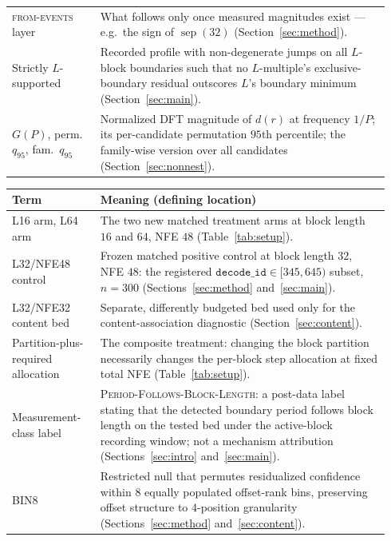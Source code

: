 \documentclass{article}
\begin{document}
\begin{longtable}{@{}>{\raggedright\arraybackslash}p{0.22\linewidth}
                       >{\raggedright\arraybackslash}p{0.72\linewidth}@{}}
\textsc{from-events} layer & What follows only once measured magnitudes exist ---
e.g.\ the sign of $\operatorname{sep}(32)$ (Section~\ref{sec:method}). \\
Strictly $L$-supported & Recorded profile with non-degenerate jumps on all
$L$-block boundaries such that no $L$-multiple's exclusive-boundary residual
outscores $L$'s boundary minimum (Section~\ref{sec:main}). \\
$G(P)$, perm.\ $q_{95}$, fam.\ $q_{95}$ & Normalized DFT magnitude of $d(r)$ at
frequency $1/P$; its per-candidate permutation $95$th percentile; the
family-wise version over all candidates (Section~\ref{sec:nonnest}). \\
\end{longtable}
\endgroup

\begin{table}[H]
\centering
\footnotesize
\setlength{\tabcolsep}{3pt}
\begin{tabular}{@{}>{\raggedright\arraybackslash}p{0.22\linewidth}
                    >{\raggedright\arraybackslash}p{0.72\linewidth}@{}}
\toprule
Term & Meaning (defining location) \\
\midrule
L16 arm, L64 arm & The two new matched treatment arms at block length
$16$ and $64$, NFE $48$ (Table~\ref{tab:setup}). \\
L32/NFE48 control & Frozen matched positive control at block length $32$,
NFE $48$: the registered $\texttt{decode\_id}\in[345,645)$ subset, $n{=}300$
(Sections~\ref{sec:method} and~\ref{sec:main}). \\
L32/NFE32 content bed & Separate, differently budgeted bed used only for the
content-association diagnostic (Section~\ref{sec:content}). \\
Partition-plus-required allocation & The composite treatment: changing the block
partition necessarily changes the per-block step allocation at fixed total NFE
(Table~\ref{tab:setup}). \\
Measurement-class label & \textsc{Period-Follows-Block-Length}: a post-data label stating that the detected
boundary period follows block length on the tested bed under the active-block
recording window; not a mechanism attribution
(Sections~\ref{sec:intro} and~\ref{sec:main}). \\
\textsc{BIN8} & Restricted null that permutes residualized confidence within $8$
equally populated offset-rank bins, preserving offset structure to
$4$-position granularity (Sections~\ref{sec:method} and~\ref{sec:content}). \\

\end{tabular}
\end{table}
\end{document}

